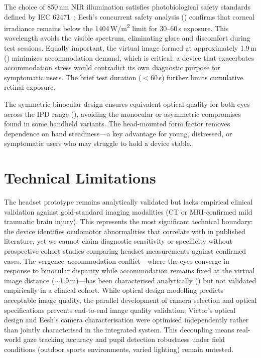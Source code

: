 The choice of 850\,nm NIR illumination satisfies photobiological safety standards defined by IEC 62471~\cite{iec62471}; Eesh's concurrent safety analysis () confirms that corneal irradiance remains below the 1404\,W/m\textsuperscript{2} limit for 30--60\,s exposure. This wavelength avoids the visible spectrum, eliminating glare and discomfort during test sessions. Equally important, the virtual image formed at approximately 1.9\,m () minimizes accommodation demand, which is critical: a device that exacerbates accommodation stress would contradict its own diagnostic purpose for symptomatic users. The brief test duration ($<60$\,s) further limits cumulative retinal exposure.

The symmetric binocular design ensures equivalent optical quality for both eyes across the IPD range (), avoiding the monocular or asymmetric compromises found in some handheld variants. The head-mounted form factor removes dependence on hand steadiness---a key advantage for young, distressed, or symptomatic users who may struggle to hold a device stable.


\section{Technical Limitations}
\label{sec:hw-technical-limitations}

The headset prototype remains analytically validated but lacks empirical clinical validation against gold-standard imaging modalities (CT or MRI-confirmed mild traumatic brain injury). This represents the most significant technical boundary: the device identifies oculomotor abnormalities that correlate with  in published literature, yet we cannot claim diagnostic sensitivity or specificity without prospective cohort studies comparing headset measurements against confirmed cases. The vergence--accommodation conflict---where the eyes converge in response to binocular disparity while accommodation remains fixed at the virtual image distance ($\sim$1.9\,m)---has been characterised analytically () but not validated empirically in a clinical cohort. While optical design modelling predicts acceptable image quality, the parallel development of camera selection and optical specifications prevents end-to-end image quality validation; Victor's optical design and Eesh's camera characterisation were optimised independently rather than jointly characterised in the integrated system. This decoupling means real-world gaze tracking accuracy and pupil detection robustness under field conditions (outdoor sports environments, varied lighting) remain untested.
